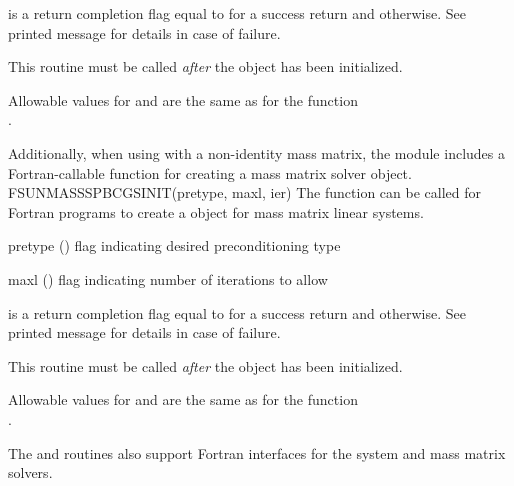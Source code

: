 {
   is a return completion flag equal to  for a success
  return and  otherwise. See printed message for details in case
  of failure.
}
{
  This routine must be called \emph{after} the {\nvector} object has
  been initialized.

  Allowable values for  and  are the same as for
  the {\CC} function \\ \noindent {}.
}
Additionally, when using
{\arkode} with a non-identity mass matrix, the {\sunlinsolspbcgs} module
includes a Fortran-callable function for creating a
 mass matrix solver object.
{
  FSUNMASSSPBCGSINIT(pretype, maxl, ier)
}
{
  The function  can be called for Fortran programs
  to create a {\sunlinsolspbcgs} object for mass matrix linear systems.
}
{
  \begin{args}[pretype]
  \item[pretype] ()
    flag indicating desired preconditioning type
  \item[maxl] ()
    flag indicating number of iterations to allow
  \end{args}
}
{
   is a  return completion flag equal to  for a success
  return and  otherwise. See printed message for details in case
  of failure.
}
{
  This routine must be called \emph{after} the {\nvector} object has
  been initialized.

  Allowable values for  and  are the same as for
  the {\CC} function \\ \noindent {}.
}
The  and
 routines also support Fortran interfaces
for the system and mass matrix solvers.

